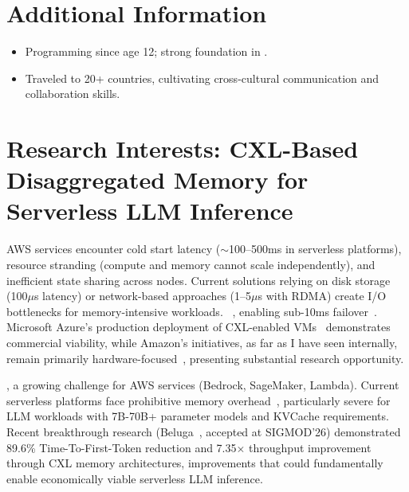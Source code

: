 \documentclass[a4paper]{article}
\begin{document}
\section{Additional Information}

\begin{itemize}
  \item Programming since age 12; strong foundation in .
  \item Traveled to 20+ countries, cultivating cross-cultural communication and collaboration skills.
\end{itemize}

\section{Research Interests: CXL-Based Disaggregated Memory for Serverless LLM Inference}\label{sec:research}

 AWS services encounter cold start latency ($\sim$100--500ms in serverless platforms), resource stranding (compute and memory cannot scale independently), and inefficient state sharing across nodes. Current solutions relying on disk storage (100$\mu$s latency) or network-based approaches (1--5$\mu$s with RDMA) create I/O bottlenecks for memory-intensive workloads. ~, enabling sub-10ms failover~. Microsoft Azure's production deployment of CXL-enabled VMs~ demonstrates commercial viability, while Amazon's initiatives, as far as I have seen internally, remain primarily hardware-focused~, presenting substantial research opportunity.

, a growing challenge for AWS services (Bedrock, SageMaker, Lambda). Current serverless platforms face prohibitive memory overhead~, particularly severe for LLM workloads with 7B-70B+ parameter models and KVCache requirements. Recent breakthrough research (Beluga~, accepted at SIGMOD'26) demonstrated 89.6\% Time-To-First-Token reduction and 7.35$\times$ throughput improvement through CXL memory architectures, improvements that could fundamentally enable economically viable serverless LLM inference.
\end{document}
